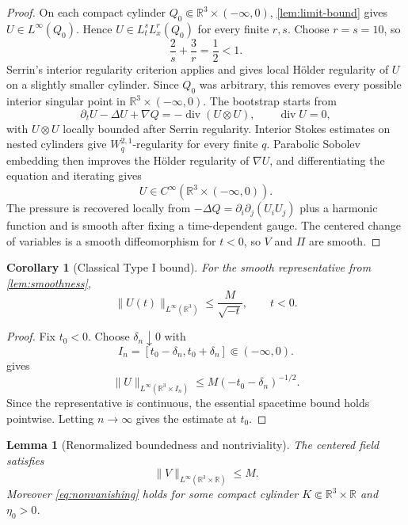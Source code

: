 \documentclass[11pt]{amsart}
\theoremstyle{plain}
\newtheorem{lemma}[theorem]{Lemma}
\newtheorem{corollary}[theorem]{Corollary}
\theoremstyle{definition}
\theoremstyle{remark}
\numberwithin{equation}{section}
\newcommand{\R}{\mathbb R}
\newcommand{\divergence}{\operatorname{div}}
\begin{document}
\begin{proof}
On each compact cylinder \(Q_0\Subset\R^3\times(-\infty,0)\),
\cref{lem:limit-bound} gives \(U\in L^\infty(Q_0)\).  Hence
\(U\in L^s_tL^r_x(Q_0)\) for every finite \(r,s\).  Choose \(r=s=10\), so
\[
   \frac2s+\frac3r=\frac12<1.
\]
Serrin's interior regularity criterion \cite{Serrin1962,Sohr2001} applies and
gives local H\"older regularity of \(U\) on a slightly smaller cylinder.
Since \(Q_0\) was arbitrary, this removes every possible interior singular
point in \(\R^3\times(-\infty,0)\).  The bootstrap starts from
\[
   \partial_tU-\Delta U+\nabla Q=-\divergence(U\otimes U),\qquad
   \divergence U=0,
\]
with \(U\otimes U\) locally bounded after Serrin regularity.  Interior Stokes
estimates on nested cylinders give \(W^{2,1}_q\)-regularity for every finite
\(q\).  Parabolic Sobolev embedding then improves the H\"older regularity of
\(\nabla U\), and differentiating the equation and iterating gives
\[
   U\in C^\infty(\R^3\times(-\infty,0)).
\]
The pressure is recovered locally from
\(-\Delta Q=\partial_i\partial_j(U_iU_j)\) plus a harmonic function and is
smooth after fixing a time-dependent gauge.  The centered change of variables
is a smooth diffeomorphism for \(t<0\), so \(V\) and \(\Pi\) are smooth.
\end{proof}

\begin{corollary}[Classical Type I bound]\label{cor:classical-type-I-bound}
For the smooth representative from \cref{lem:smoothness},
\[
   \|U(t)\|_{L^\infty(\R^3)}\le \frac{M}{\sqrt{-t}},
   \qquad t<0.
\]
\end{corollary}

\begin{proof}
Fix \(t_0<0\).  Choose \(\delta_n\downarrow0\) with
\[
   I_n=[t_0-\delta_n,t_0+\delta_n]\Subset(-\infty,0).
\]
 gives
\[
   \|U\|_{L^\infty(\R^3\times I_n)}
   \le M(-t_0-\delta_n)^{-1/2}.
\]
Since the representative is continuous, the essential spacetime bound holds
pointwise.  Letting \(n\to\infty\) gives the estimate at \(t_0\).
\end{proof}

\begin{lemma}[Renormalized boundedness and nontriviality]
\label{lem:renorm-bounds}
The centered field satisfies
\[
   \|V\|_{L^\infty(\R^3\times\R)}\le M.
\]
Moreover \eqref{eq:nonvanishing} holds for some compact cylinder
\(K\Subset\R^3\times\R\) and \(\eta_0>0\).
\end{lemma}
\end{document}
